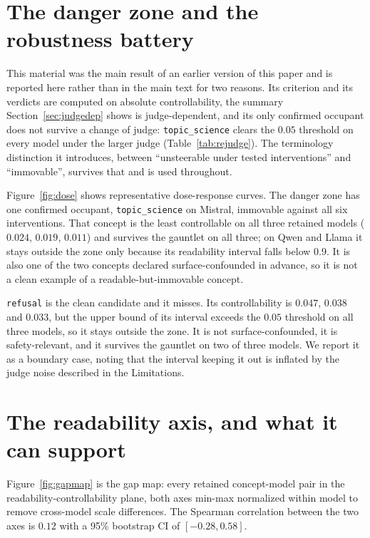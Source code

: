 \documentclass{article}
\begin{document}
\section{The danger zone and the robustness battery}
\label{app:dangerzone}

This material was the main result of an earlier version of this paper and is
reported here rather than in the main text for two reasons. Its criterion and
its verdicts are computed on absolute controllability, the summary
Section~\ref{sec:judgedep} shows is judge-dependent, and its only confirmed
occupant does not survive a change of judge: \texttt{topic\_science}
clears the $0.05$ threshold on every model under the larger judge
(Table~\ref{tab:rejudge}). The terminology distinction it introduces, between
``unsteerable under tested interventions'' and ``immovable'', survives that and
is used throughout.


Figure~\ref{fig:dose} shows representative dose-response curves. The danger
zone has one confirmed occupant, \texttt{topic\_science} on Mistral,
immovable against all six interventions. That concept is the least controllable
on all three retained models ($0.024$, $0.019$, $0.011$) and survives the
gauntlet on all three; on Qwen and Llama it stays outside the zone only because
its readability interval falls below $0.9$. It is also one of the two concepts
declared surface-confounded in advance, so it is not a clean example of a
readable-but-immovable concept.

\texttt{refusal} is the clean candidate and it misses. Its controllability is
$0.047$, $0.038$ and $0.033$, but the upper bound of its interval exceeds the
$0.05$ threshold on all three models, so it stays outside the zone. It is not
surface-confounded, it is safety-relevant, and it survives the gauntlet on two of
three models. We report it as a boundary case, noting that the interval keeping
it out is inflated by the judge noise described in the Limitations.

\section{The readability axis, and what it can support}

Figure~\ref{fig:gapmap} is the gap map: every retained concept-model pair in the
readability-controllability plane, both axes min-max normalized within model to
remove cross-model scale differences. The Spearman correlation between the two
axes is $0.12$ with a 95\% bootstrap CI of $[-0.28, 0.58]$.
\end{document}

